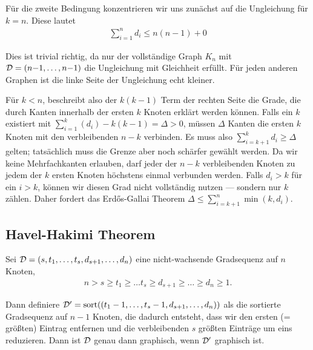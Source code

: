 Für die zweite Bedingung konzentrieren wir uns zunächst auf die Ungleichung für $k = n$.
Diese lautet
\begin{align}
    \sum_{i=1}^n d_i \le n(n-1) + 0
\end{align}

Dies ist trivial richtig, da nur der vollständige Graph $K_n$ mit $\mathcal{D} = (n{-}1, \ldots, n{-}1)$ die Ungleichung mit Gleichheit erfüllt.
Für jeden anderen Graphen ist die linke Seite der Ungleichung echt kleiner.

Für $k < n$, beschreibt also der $k(k-1)$ Term der rechten Seite die Grade, die durch Kanten innerhalb der ersten $k$ Knoten erklärt werden können.
Falls ein $k$ existiert mit $\sum_{i=1}^k (d_i) - k(k-1) = \Delta > 0$, müssen $\Delta$ Kanten die ersten $k$ Knoten mit den verbleibenden $n - k$ verbinden.
Es muss also $\sum_{i=k+1}^k d_i \ge \Delta$ gelten; tatsächlich muss die Grenze aber noch schärfer gewählt werden.
Da wir keine Mehrfachkanten erlauben, darf jeder der $n-k$ verbleibenden Knoten zu jedem der $k$ ersten Knoten höchstens einmal verbunden werden.
Falls $d_i > k$ für ein $i > k$, können wir diesen Grad nicht vollständig nutzen --- sondern nur $k$  zählen.
Daher fordert das Erd\H{o}s-Gallai Theorem $\Delta \le \sum_{i=k+1}^n \min(k, d_i)$.

\subsection{Havel-Hakimi Theorem}
\begin{theorem}
    Sei $\mathcal{D} = (s, t_1, \ldots, t_s, d_{s+1}, \ldots, d_n)$ eine nicht-wachsende Gradsequenz auf $n$ Knoten, \dh
    \begin{align}
        n > s \ge t_1 \ge \ldots t_s \ge d_{s+1} \ge \ldots \ge d_n \ge 1.
    \end{align}

    \noindent
    Dann definiere $\mathcal{D}' = \text{sort}((t_1 - 1, \ldots, t_s - 1, d_{s+1}, \ldots, d_n))$ als die sortierte Gradsequenz auf $n-1$ Knoten,
    die dadurch entsteht, dass wir den ersten (= größten) Eintrag entfernen und die verbleibenden $s$ größten Einträge um eins reduzieren.
    Dann ist $\mathcal{D}$ genau dann graphisch, wenn $\mathcal{D}'$ graphisch ist.
\end{theorem}

